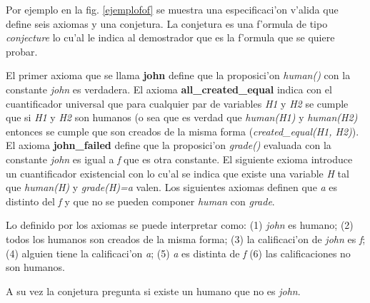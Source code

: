Por ejemplo en la fig. \ref{ejemplofof} se muestra una especificaci'on v'alida que define seis axiomas y una conjetura. La conjetura es una f'ormula de tipo \textit{conjecture} lo cu'al le indica al demostrador que es la f'ormula que se quiere probar. 

El primer axioma que se llama \textbf{john} define que la proposici'on  \textit{human()} con la constante \textit{john} es verdadera.
El axioma \textbf{all\_created\_equal} indica con el cuantificador universal que para cualquier par de variables \textit{H1} y \textit{H2} se cumple que si \textit{H1} y \textit{H2} son humanos (o sea que es verdad que \textit{human(H1)} y \textit{human(H2)} entonces se cumple que son creados de la misma forma (\textit{created\_equal(H1, H2)}).
El axioma \textbf{john\_failed} define que la proposici'on \textit{grade()} evaluada con la constante \textit{john} es igual a \textit{f} que es otra constante.
El siguiente exioma introduce un cuantificador existencial con lo cu'al se indica que existe una variable \textit{H} tal que \textit{human(H)} y \textit{grade(H)=a} valen.
Los siguientes axiomas definen que \textit{a} es distinto del \textit{f} y que no se pueden componer \textit{human} con \textit{grade}.

Lo definido por los axiomas se puede interpretar como: (1) \textit{john} es humano; (2) todos los humanos son creados de la misma forma; (3) la calificaci'on de \textit{john} es \textit{f}; (4) alguien tiene la calificaci'on \textit{a}; (5) \textit{a} es distinta de \textit{f} (6) las calificaciones no son humanos.

A su vez la conjetura pregunta si existe un humano que no es \textit{john}.


